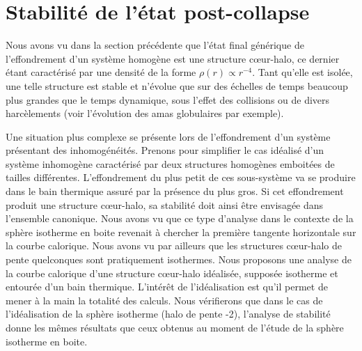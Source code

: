 \section{Stabilité de l'état post-collapse\label{Sec::ToyModel}}

Nous avons vu dans la section précédente que l'état final générique de l'effondrement d'un système homogène est une structure cœur-halo, ce dernier
étant caractérisé par une densité de la forme $\rho(r)\propto r^{-4}$. Tant qu'elle est isolée, une telle structure est stable et n'évolue que sur des
échelles de temps beaucoup plus grandes que le temps dynamique, sous l'effet des collisions ou de divers harcèlements (voir l'évolution des amas
globulaires par exemple).

Une situation plus complexe se présente lors de l'effondrement d'un système présentant des inhomogénéités. Prenons pour simplifier le cas idéalisé
d'un système inhomogène caractérisé par deux structures homogènes emboitées de tailles différentes. L'effondrement du plus petit de ces sous-système
va se produire dans le bain thermique assuré par la présence du plus gros. Si cet effondrement produit une structure cœur-halo, sa stabilité doit
ainsi être envisagée dans l'ensemble canonique. Nous avons vu que ce type d'analyse dans le contexte de la sphère isotherme en boite revenait à
chercher la première tangente horizontale sur la courbe calorique. Nous avons vu par ailleurs que les structures cœur-halo de pente quelconques
sont pratiquement isothermes. Nous proposons une analyse de la courbe calorique d'une structure cœur-halo idéalisée, supposée
isotherme et entourée d'un bain thermique. L'intérêt de l'idéalisation est qu'il permet de mener à la main la totalité des calculs. Nous vérifierons
que dans le cas de l'idéalisation de la sphère isotherme (halo de pente -2), l'analyse de stabilité donne les mêmes résultats que ceux obtenus au
moment de l'étude de la sphère isotherme en boite.

